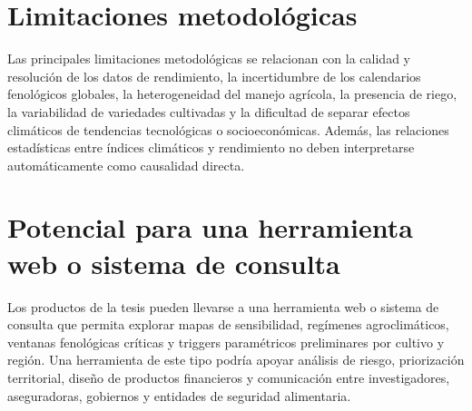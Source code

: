
\section{Limitaciones metodológicas}

Las principales limitaciones metodológicas se relacionan con la calidad y resolución de los datos de rendimiento, la incertidumbre de los calendarios fenológicos globales, la heterogeneidad del manejo agrícola, la presencia de riego, la variabilidad de variedades cultivadas y la dificultad de separar efectos climáticos de tendencias tecnológicas o socioeconómicas. Además, las relaciones estadísticas entre índices climáticos y rendimiento no deben interpretarse automáticamente como causalidad directa.


\section{Potencial para una herramienta web o sistema de consulta}

Los productos de la tesis pueden llevarse a una herramienta web o sistema de consulta que permita explorar mapas de sensibilidad, regímenes agroclimáticos, ventanas fenológicas críticas y triggers paramétricos preliminares por cultivo y región. Una herramienta de este tipo podría apoyar análisis de riesgo, priorización territorial, diseño de productos financieros y comunicación entre investigadores, aseguradoras, gobiernos y entidades de seguridad alimentaria.

